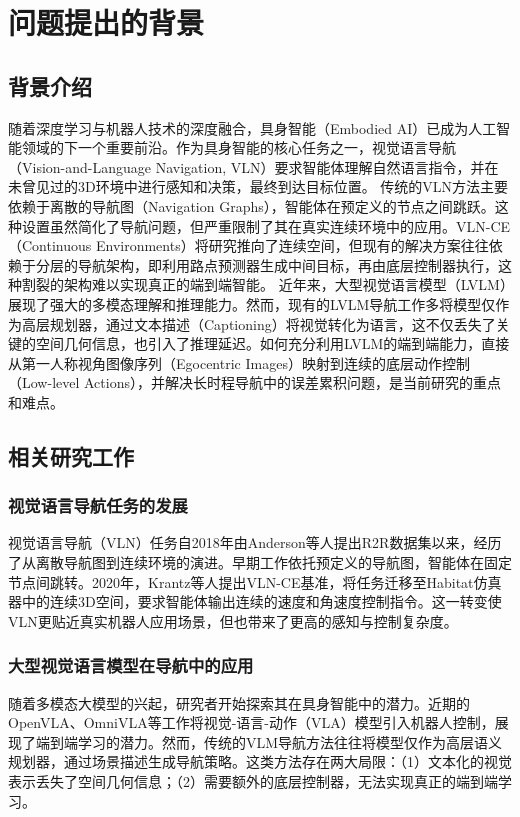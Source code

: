 \section{问题提出的背景}
\subsection{背景介绍}
随着深度学习与机器人技术的深度融合，具身智能（Embodied AI）已成为人工智能领域的下一个重要前沿。作为具身智能的核心任务之一，视觉语言导航（Vision-and-Language Navigation, VLN）要求智能体理解自然语言指令，并在未曾见过的3D环境中进行感知和决策，最终到达目标位置。
传统的VLN方法主要依赖于离散的导航图（Navigation Graphs），智能体在预定义的节点之间跳跃。这种设置虽然简化了导航问题，但严重限制了其在真实连续环境中的应用。VLN-CE（Continuous Environments）\cite{krantz2020beyond}将研究推向了连续空间，但现有的解决方案往往依赖于分层的导航架构\cite{bridging_gap}，即利用路点预测器生成中间目标，再由底层控制器执行，这种割裂的架构难以实现真正的端到端智能。
近年来，大型视觉语言模型（LVLM）展现了强大的多模态理解和推理能力。然而，现有的LVLM导航工作多将模型仅作为高层规划器，通过文本描述（Captioning）将视觉转化为语言，这不仅丢失了关键的空间几何信息，也引入了推理延迟。如何充分利用LVLM的端到端能力，直接从第一人称视角图像序列（Egocentric Images）映射到连续的底层动作控制（Low-level Actions），并解决长时程导航中的误差累积问题，是当前研究的重点和难点。

\subsection{相关研究工作}
\subsubsection{视觉语言导航任务的发展}
视觉语言导航（VLN）任务自2018年由Anderson等人提出R2R数据集以来，经历了从离散导航图到连续环境的演进。早期工作依托预定义的导航图，智能体在固定节点间跳转。2020年，Krantz等人提出VLN-CE基准\cite{krantz2020beyond}，将任务迁移至Habitat仿真器\cite{savva2019habitat}中的连续3D空间，要求智能体输出连续的速度和角速度控制指令。这一转变使VLN更贴近真实机器人应用场景，但也带来了更高的感知与控制复杂度。

\subsubsection{大型视觉语言模型在导航中的应用}
随着多模态大模型的兴起，研究者开始探索其在具身智能中的潜力。近期的OpenVLA\cite{kim2024openvla}、OmniVLA\cite{omnivla}等工作将视觉-语言-动作（VLA）模型引入机器人控制，展现了端到端学习的潜力。然而，传统的VLM导航方法往往将模型仅作为高层语义规划器，通过场景描述生成导航策略。这类方法存在两大局限：（1）文本化的视觉表示丢失了空间几何信息；（2）需要额外的底层控制器，无法实现真正的端到端学习。

